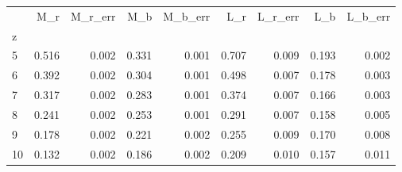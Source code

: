 \begin{tabular}{lrrrrrrrr}
\toprule
{} &    M\_r &  M\_r\_err &    M\_b &  M\_b\_err &    L\_r &  L\_r\_err &    L\_b &  L\_b\_err \\
z  &        &          &        &          &        &          &        &          \\
\midrule
5  &  0.516 &    0.002 &  0.331 &    0.001 &  0.707 &    0.009 &  0.193 &    0.002 \\
6  &  0.392 &    0.002 &  0.304 &    0.001 &  0.498 &    0.007 &  0.178 &    0.003 \\
7  &  0.317 &    0.002 &  0.283 &    0.001 &  0.374 &    0.007 &  0.166 &    0.003 \\
8  &  0.241 &    0.002 &  0.253 &    0.001 &  0.291 &    0.007 &  0.158 &    0.005 \\
9  &  0.178 &    0.002 &  0.221 &    0.002 &  0.255 &    0.009 &  0.170 &    0.008 \\
10 &  0.132 &    0.002 &  0.186 &    0.002 &  0.209 &    0.010 &  0.157 &    0.011 \\
\bottomrule
\end{tabular}
